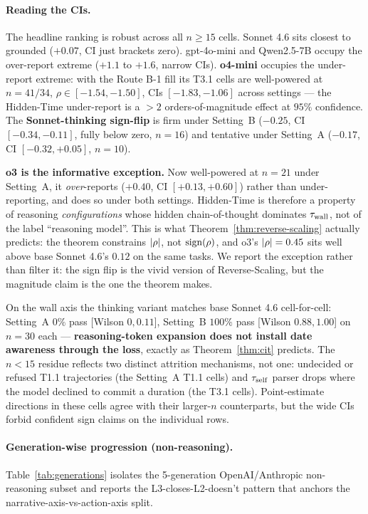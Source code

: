 \paragraph{Reading the CIs.}
The headline ranking is robust across all $n{\geq}15$ cells. Sonnet 4.6 sits closest to grounded ($+0.07$, CI just brackets zero). gpt-4o-mini and Qwen2.5-7B occupy the over-report extreme ($+1.1$ to $+1.6$, narrow CIs). \textbf{o4-mini} occupies the under-report extreme: with the Route B-1 fill its T3.1 cells are well-powered at $n{=}41/34$, $\rho \in [-1.54,-1.50]$, CIs $[-1.83,-1.06]$ across settings --- the Hidden-Time under-report is a $>2$ orders-of-magnitude effect at $95\%$ confidence. The \textbf{Sonnet-thinking sign-flip} is firm under Setting~B ($-0.25$, CI $[-0.34,-0.11]$, fully below zero, $n{=}16$) and tentative under Setting~A ($-0.17$, CI $[-0.32,+0.05]$, $n{=}10$).

\textbf{o3 is the informative exception.} Now well-powered at $n{=}21$ under Setting~A, it \emph{over}-reports ($+0.40$, CI $[+0.13,+0.60]$) rather than under-reporting, and does so under both settings. Hidden-Time is therefore a property of reasoning \emph{configurations} whose hidden chain-of-thought dominates $\tau_{\mathrm{wall}}$, not of the label ``reasoning model''. This is what Theorem~\ref{thm:reverse-scaling} actually predicts: the theorem constrains $|\rho|$, not $\mathrm{sign}(\rho)$, and o3's $|\rho| = 0.45$ sits well above base Sonnet 4.6's $0.12$ on the same tasks. We report the exception rather than filter it: the sign flip is the vivid version of Reverse-Scaling, but the magnitude claim is the one the theorem makes.

On the wall axis the thinking variant matches base Sonnet 4.6 cell-for-cell: Setting~A $0\%$ pass [Wilson $0,0.11$], Setting~B $100\%$ pass [Wilson $0.88,1.00$] on $n{=}30$ each --- \textbf{reasoning-token expansion does not install date awareness through the loss}, exactly as Theorem~\ref{thm:cit} predicts. The $n{<}15$ residue reflects two distinct attrition mechanisms, not one: undecided or refused T1.1 trajectories (the Setting~A T1.1 cells) and $\tau_{\mathrm{self}}$ parser drops where the model declined to commit a duration (the T3.1 cells). Point-estimate directions in these cells agree with their larger-$n$ counterparts, but the wide CIs forbid confident sign claims on the individual rows.

\paragraph{Generation-wise progression (non-reasoning).}
Table~\ref{tab:generations} isolates the 5-generation OpenAI/Anthropic non-reasoning subset and reports the L3-closes-L2-doesn't pattern that anchors the narrative-axis-vs-action-axis split.

